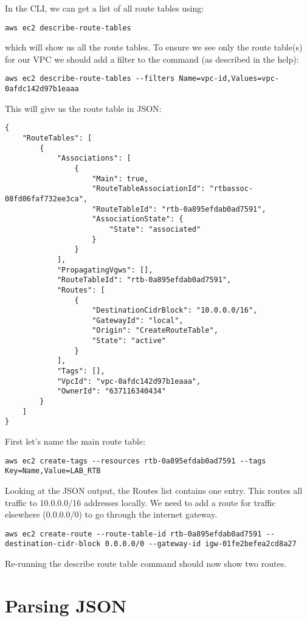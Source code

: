 \documentclass{pgnotes}
\begin{document}
In the CLI, we can get a list of all route tables using:
\begin{verbatim}
aws ec2 describe-route-tables
\end{verbatim}
which will show us all the route tables.
To ensure we see only the route table(s) for our VPC we should add a filter to the command (as described in the help):
\begin{verbatim}
aws ec2 describe-route-tables --filters Name=vpc-id,Values=vpc-0afdc142d97b1eaaa
\end{verbatim}
This will give us the route table in JSON:
\begin{verbatim}
{
    "RouteTables": [
        {
            "Associations": [
                {
                    "Main": true,
                    "RouteTableAssociationId": "rtbassoc-08fd06faf732ee3ca",
                    "RouteTableId": "rtb-0a895efdab0ad7591",
                    "AssociationState": {
                        "State": "associated"
                    }
                }
            ],
            "PropagatingVgws": [],
            "RouteTableId": "rtb-0a895efdab0ad7591",
            "Routes": [
                {
                    "DestinationCidrBlock": "10.0.0.0/16",
                    "GatewayId": "local",
                    "Origin": "CreateRouteTable",
                    "State": "active"
                }
            ],
            "Tags": [],
            "VpcId": "vpc-0afdc142d97b1eaaa",
            "OwnerId": "637116340434"
        }
    ]
}
\end{verbatim}
First let's name the main route table:
\begin{verbatim}
aws ec2 create-tags --resources rtb-0a895efdab0ad7591 --tags Key=Name,Value=LAB_RTB
\end{verbatim}
Looking at the JSON output, the Routes list contains one entry.
This routes all traffic to 10.0.0.0/16 addresses locally.
We need to add a route for traffic elsewhere (0.0.0.0/0) to go through the internet gateway.
\begin{verbatim}
aws ec2 create-route --route-table-id rtb-0a895efdab0ad7591 --destination-cidr-block 0.0.0.0/0 --gateway-id igw-01fe2befea2cd8a27
\end{verbatim}
Re-running the describe route table command should now show two routes.

\section{Parsing JSON}
\end{document}
